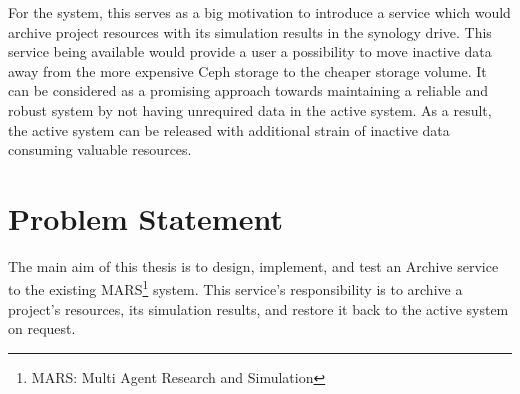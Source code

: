             \par

            For the system, this serves as a big
            motivation to introduce a service which would archive  project resources with its
            simulation results in the synology drive. This service being available would provide a user a possibility
            to move inactive data away from the more expensive Ceph storage to the cheaper storage volume.
            It can be considered as a promising approach towards maintaining a reliable and robust system by not having unrequired data in the 
            active system. As a result, the active system can be released with additional strain of inactive data consuming valuable resources.

 

    \newpage        
    \section{Problem Statement}

        The main aim of this thesis is to design, implement, and test an Archive service
        to the existing MARS\footnote{MARS: Multi Agent Research and Simulation} system. This service's responsibility is to archive a project's resources,
        its simulation results, and restore it back to the active system on request. 
        
